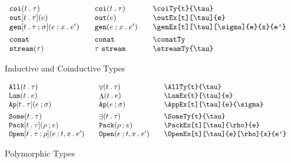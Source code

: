 \documentclass[11pt]{article}
\begin{document}
\begin{figure}
\begin{small}
\begin{displaymath}
\begin{array}{l@{\qquad}l@{\qquad}l@{\qquad}l}
        \coiTy{t}{\tau}                            & \coiTy*{t}{\tau}                & \verb|\coiTy{t}{\tau}|                            \\
        \outEx[t][\tau]{e}                         & \outEx*{e}                      & \verb|\outEx[t][\tau]{e}|                         \\
        \genEx[t][\tau][\sigma]{e}{x}{e'}          & \genEx*{e}{x}{e'}               & \verb|\genEx[t][\tau][\sigma]{e}{x}{e'}|          \\[1ex]
  
        \conatTy                                 & \conatTy*                     & \verb|\conatTy|                                   \\
        \streamTy{\tau}                            & \streamTy*{\tau}                & \verb|\streamTy{\tau}|
      \end{array}
    \end{displaymath}
  \end{small}

  \caption{Inductive and Coinductive Types}
  \label{fig:icoi}
\end{figure}

\begin{figure}
  
  \begin{small}
    \begin{displaymath}
      \begin{array}{l@{\qquad}l@{\qquad}l@{\qquad}l}
        \AllTy{t}{\tau}                  & \AllTy*{t}{\tau}                  & \verb|\AllTy{t}{\tau}|                  \\
        \LamEx{t}[\tau]{e}               & \LamEx*{t}{e}                     & \verb|\LamEx{t}[\tau]{e}|               \\
        \AppEx[t][\tau]{e}{\sigma}       & \AppEx*{e}{\sigma}                & \verb|\AppEx[t][\tau]{e}{\sigma}|       \\[1ex]
        \SomeTy{t}{\tau}                 & \SomeTy*{t}{\tau}                 & \verb|\SomeTy{t}{\tau}|                 \\
        \PackEx[t][\tau]{\rho}{e}        & \PackEx*{\rho}{e}                 & \verb|\PackEx[t][\tau]{\rho}{e}|        \\
        \OpenEx[t][\tau]{e}[\rho]{x}{e'} & \OpenEx*[t][\tau]{e}[\rho]{x}{e'} & \verb|\OpenEx[t][\tau]{e}[\rho]{x}{e'}|
      \end{array}
    \end{displaymath}
  \end{small}
  
  \caption{Polymorphic Types}
  \label{fig:poly}
\end{figure}
\end{document}
